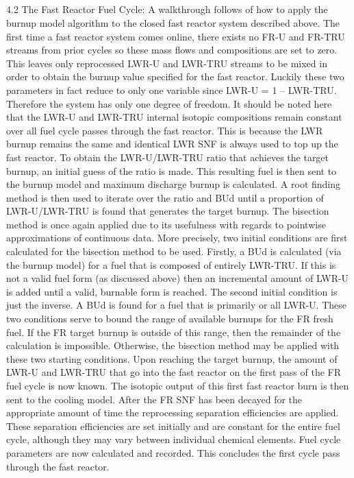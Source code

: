 \subsection{}
\label{1g_sec:}
4.2 The Fast Reactor Fuel Cycle:
A walkthrough follows of how to apply the burnup model algorithm to the closed fast reactor system described above.  The first time a fast reactor system comes online, there exists no FR-U and FR-TRU streams from prior cycles so these mass flows and compositions are set to zero.   This leaves only reprocessed LWR-U and LWR-TRU streams to be mixed in order to obtain the burnup value specified for the fast reactor.  Luckily these two parameters in fact reduce to only one variable since LWR-U = 1 – LWR-TRU.  Therefore the system has only one degree of freedom.  
It should be noted here that the LWR-U and LWR-TRU internal isotopic compositions remain constant over all fuel cycle passes through the fast reactor.  This is because the LWR burnup remains the same  and identical LWR SNF is always used to top up the fast reactor.  
To obtain the LWR-U/LWR-TRU ratio that achieves the target burnup, an initial guess of the ratio is made.  This resulting fuel is then sent to the burnup model and maximum discharge burnup is calculated.  A root finding method is then used to iterate over the ratio and BUd until a proportion of LWR-U/LWR-TRU is found that generates the target burnup.  The bisection method is once again applied due to its usefulness with regards to pointwise approximations of continuous data.
More precisely, two initial conditions are first calculated for the bisection method to be used.  Firstly, a BUd is calculated (via the burnup model) for a fuel that is composed of entirely LWR-TRU.  If this is not a valid fuel form (as discussed above) then an incremental amount of LWR-U is added until a valid, burnable form is reached.  The second initial condition is just the inverse.  A BUd is found for a fuel that is primarily or all LWR-U.  These two conditions serve to bound the range of available burnups for the FR fresh fuel.  If the FR target burnup is outside of this range, then the remainder of the calculation is impossible.  Otherwise, the bisection method may be applied with these two starting conditions.  Upon reaching the target burnup, the amount of LWR-U and LWR-TRU that go into the fast reactor on the first pass of the FR fuel cycle is now known.
The isotopic output of this first fast reactor burn is then sent to the cooling model.   After the FR SNF has been decayed for the appropriate amount of time the reprocessing separation efficiencies are applied.  These separation efficiencies are set initially and are constant for the entire fuel cycle, although they may vary between individual chemical elements.  Fuel cycle parameters are now calculated and recorded.  This concludes the first cycle pass through the fast reactor.  
